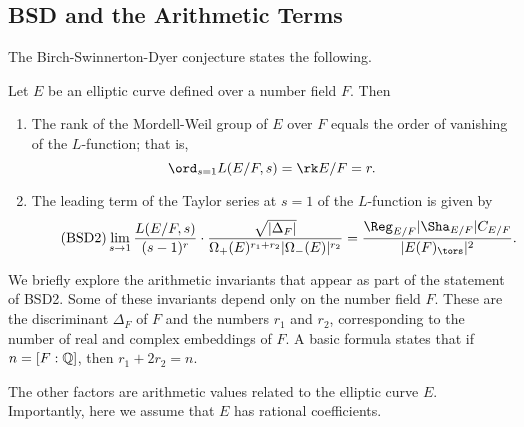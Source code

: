\subsection{BSD and the Arithmetic Terms}\label{sec-explain-terms}

The Birch-Swinnerton-Dyer conjecture states the following.

\begin{conj}[BSD]
    Let $E$ be an elliptic curve defined over a number field $F$. Then 
    \begin{enumerate}[label={\bfseries  BSD\arabic*.}]
        \item The rank of the Mordell-Weil group of $E$ over $F$ equals the order of vanishing of the $L$-function; that is,
        $$\ord_{s=1}L(E/F,s)=\rk E/F = r.$$
        \item The leading term of the Taylor series at $s=1$ of the $L$-function is given by 
        \begin{equation}\label{BSD_2}\tag{BSD2}
            \lim_{s\to1}\frac{L(E/F,s)}{(s-1)^r}\cdot\frac{\sqrt{|\Delta_F|}}{\Omega_+(E)^{r_1+r_2}|\Omega_-(E)|^{r_2}}=\frac{\Reg_{E/F}|\Sha_{E/F}|C_{E/F}}{|E(F)_{\tors}|^2}.
        \end{equation}
    \end{enumerate}
\end{conj}

We briefly explore the arithmetic invariants that appear as part of the statement of BSD2. Some of these invariants depend only on the number field $F$. These are the discriminant $\Delta_F$ of $F$ and the numbers $r_1$ and $r_2$, corresponding to the number of real and complex embeddings of $F$. A basic formula states that if $n=[F:\mathbb{Q}]$, then $r_1+2r_2=n$. 

The other factors are arithmetic values related to the elliptic curve $E$. Importantly, here we assume that $E$ has rational coefficients.

